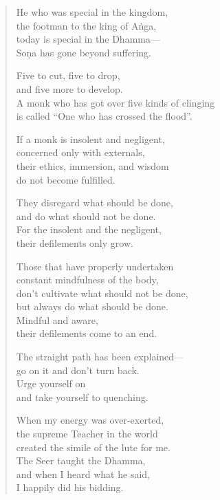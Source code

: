 \documentclass[12pt,openany]{book}%
\begin{document}
\begin{verse}%
He who was special in the kingdom, \\
the footman to the king of \textsanskrit{Aṅga}, \\
today is special in the Dhamma—\\
\textsanskrit{Soṇa} has gone beyond suffering. 

Five to cut, five to drop, \\
and five more to develop. \\
A monk who has got over five kinds of clinging \\
is called “One who has crossed the flood”. 

If a monk is insolent and negligent, \\
concerned only with externals, \\
their ethics, immersion, and wisdom \\
do not become fulfilled. 

They disregard what should be done, \\
and do what should not be done. \\
For the insolent and the negligent, \\
their defilements only grow. 

Those that have properly undertaken \\
constant mindfulness of the body, \\
don’t cultivate what should not be done, \\
but always do what should be done. \\
Mindful and aware, \\
their defilements come to an end. 

The straight path has been explained—\\
go on it and don’t turn back. \\
Urge yourself on \\
and take yourself to quenching. 

When my energy was over-exerted, \\
the supreme Teacher in the world \\
created the simile of the lute for me. \\
The Seer taught the Dhamma, \\
and when I heard what he said, \\
I happily did his bidding. 


\end{verse}
\end{document}
